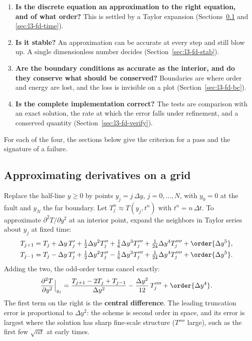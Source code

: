 \begin{enumerate}[itemsep=1pt,topsep=2pt]
\item \textbf{Is the discrete equation an approximation to the right equation, and of what order?} This is settled by a Taylor expansion (Sections~\ref{sec:l3-fd-space} and \ref{sec:l3-fd-time}).
\item \textbf{Is it stable?} An approximation can be accurate at every step and still blow up. A single dimensionless number decides (Section~\ref{sec:l3-fd-stab}).
\item \textbf{Are the boundary conditions as accurate as the interior, and do they conserve what should be conserved?} Boundaries are where order and energy are lost, and the loss is invisible on a plot (Section~\ref{sec:l3-fd-bc}).
\item \textbf{Is the complete implementation correct?} The tests are comparison with an exact solution, the rate at which the error falls under refinement, and a conserved quantity (Section~\ref{sec:l3-fd-verify}).
\end{enumerate}

For each of the four, the sections below give the criterion for a pass and the signature of a failure.

\subsection{Approximating derivatives on a grid}
\label{sec:l3-fd-space}

Replace the half-line $y\ge0$ by points $y_j=j\,\Delta y$, $j=0,\dots,N$, with $y_0=0$ at the fault and $y_N$ the far boundary. Let $T_j^n\approx T(y_j,t^n)$ with $t^n=n\,\Delta t$. To approximate $\partial^2T/\partial y^2$ at an interior point, expand the neighbors in Taylor series about $y_j$ at fixed time:
\begin{align}
T_{j+1}&=T_j+\Delta y\,T_j'+\tfrac12\Delta y^2T_j''+\tfrac16\Delta y^3T_j'''+\tfrac1{24}\Delta y^4T_j''''+\order{\Delta y^5},\\
T_{j-1}&=T_j-\Delta y\,T_j'+\tfrac12\Delta y^2T_j''-\tfrac16\Delta y^3T_j'''+\tfrac1{24}\Delta y^4T_j''''+\order{\Delta y^5}.
\end{align}
Adding the two, the odd-order terms cancel exactly:
\begin{equation}
\frac{\partial^2T}{\partial y^2}\Big|_{y_j}=\frac{T_{j+1}-2T_j+T_{j-1}}{\Delta y^2}-\frac{\Delta y^2}{12}\,T_j''''+\order{\Delta y^4}.
\label{eq:l3-central}
\end{equation}
The first term on the right is the \textbf{central difference}. The leading truncation error is proportional to $\Delta y^2$: the scheme is second order in space, and its error is largest where the solution has sharp fine-scale structure ($T''''$ large), such as the first few $\sqrt{\alpha t}$ at early times.

